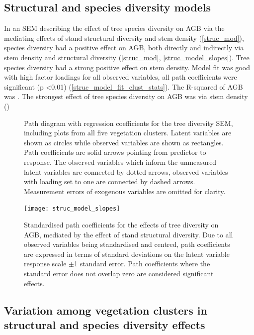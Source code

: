 \documentclass[11pt,a4paper]{article}
\begin{document}
\subsection{Structural and species diversity models}

In an SEM describing the effect of tree species diversity on AGB via the mediating effects of stand structural diversity and stem density (\autoref{struc_mod}), species diversity had a positive effect on AGB, both directly and indirectly via stem density and structural diversity (\autoref{struc_mod}, \autoref{struc_model_slopes}). Tree species diversity had a strong positive effect on stem density. Model fit was good with high factor loadings for all observed variables, all path coefficients were significant (p <0.01) (\autoref{struc_model_fit_clust_stats}). The R-squared of AGB was \strucrsq{}. The strongest effect of tree species diversity on AGB was via stem density (\strucsib{})


\begin{figure}[H]
\centering
	
	\caption{Path diagram with regression coefficients for the tree diversity SEM, including plots from all five vegetation clusters. Latent variables are shown as circles while observed variables are shown as rectangles. Path coefficients are solid arrows pointing from predictor to response. The observed variables which inform the unmeasured latent variables are connected by dotted arrows, observed variables with loading set to one are connected by dashed arrows. Measurement errors of exogenous variables are omitted for clarity.}
	\label{struc_mod}
\end{figure}

\begin{figure}[H]
\centering
	\texttt{[image: struc\_model\_slopes]}
	\caption{Standardised path coefficients for the effects of tree diversity on AGB, mediated by the effect of stand structural diversity. Due to all observed variables being standardised and centred, path coefficients are expressed in terms of standard deviations on the latent variable response scale $\pm$1 standard error. Path coefficients where the standard error does not overlap zero are considered significant effects.}
	\label{struc_model_slopes}
\end{figure}

\subsection{Variation among vegetation clusters in structural and species diversity effects}
\end{document}
